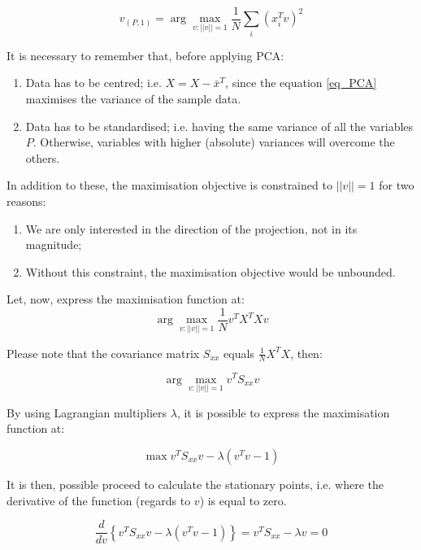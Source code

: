 \begin{equation}
v_{\left(P,1\right)}=\arg\max_{v:\left|\left|v\right|\right|=1}{{\frac{1}{N}\sum_{i}\left(x_i^Tv\right)^2}}
\label{eq_PCA}
\end{equation}

It is necessary to remember that, before applying PCA:
\begin{enumerate}
    \item Data has to be centred; i.e. $X=X-{\bar{x}}^T$, since the equation \ref{eq_PCA} maximises the variance of the sample data.
    \item Data has to be standardised;  i.e. having the same variance of all the variables $P$. Otherwise, variables with higher (absolute) variances will overcome the others.
\end{enumerate}

In addition to these, the maximisation objective is constrained to $\left|\left|v\right|\right|=1$ for two reasons:

\begin{enumerate}
    \item We are only interested in the direction of the projection, not in its magnitude;
    \item Without this constraint, the maximisation objective would be unbounded.
\end{enumerate}

Let, now, express the maximisation function at:
\begin{equation}
\arg\max_{v:\left|\left|v\right|\right|=1}{{\frac{1}{N}v^TX^TXv}}
\label{eq_PCA1}
\end{equation}

Please note that the covariance matrix $S_{xx}$ equals $\frac{1}{N}X^TX$, then:

\begin{equation}
\arg\max_{v:\left|\left|v\right|\right|=1}{{v^TS_{xx}v}}
\label{eq_PCA2}
\end{equation}

By using Lagrangian multipliers $\lambda$, it is possible to express the maximisation function at:

\begin{equation}
\max{v^TS_{xx}v-\lambda(v^Tv-1)}
\label{eq_PCA3}
\end{equation}

It is then, possible proceed to calculate the stationary points, i.e. where the derivative of the function (regards to $v$) is equal to zero.

\begin{equation}
\frac{d}{dv}\left\{v^TS_{xx}v-\lambda\left(v^Tv-1\right)\right\}=v^TS_{xx}-\lambda v=0
\label{eq_PCA4}
\end{equation}


